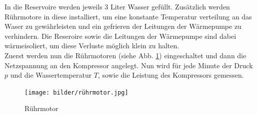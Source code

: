 In die Reservoire werden jeweils 3 Liter Wasser gefüllt. Zusätzlich werden
Rührmotore in diese installiert, um eine konstante Temperatur verteilung an 
das Waser zu gewährleisten und ein gefrieren der Leitungen der Wärmepumpe zu verhindern.
Die Reseroire sowie die Leitungen der Wärmepumpe sind dabei wärmeisoliert,
um diese Verluste möglich klein zu halten.\\

Zuerst werden nun die Rührmotoren (siehe Abb. \ref{fig:rührmotor}) eingeschaltet und dann die Netzspannung
an den Kompressor angelegt.
Nun wird für jede Minute der Druck $p$ und die Wassertemperatur $T$, sowie die 
Leistung des Kompressors gemessen.\\
\begin{figure}
    \centering
    \texttt{[image: bilder/rührmotor.jpg]}
    \caption{Rührmotor}
    \label{fig:rührmotor}
\end{figure}
\label{sec:Durchfuehrung}